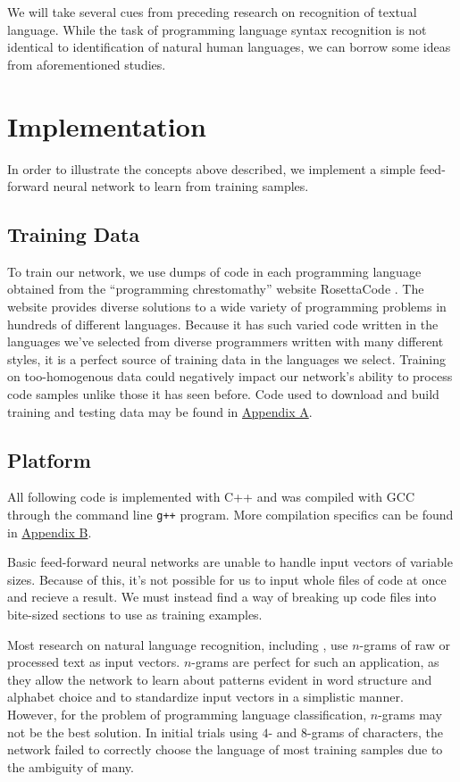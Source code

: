 \documentclass{article}
\begin{document}
We will take several cues from preceding research on recognition of textual language. While the task of programming language syntax recognition is not identical to identification of natural human languages, we can borrow some ideas from aforementioned studies.

\section{Implementation}
In order to illustrate the concepts above described, we implement a simple feed-forward neural network to learn from training samples.

\subsection{Training Data}
To train our network, we use dumps of code in each programming language obtained from the ``programming chrestomathy'' website RosettaCode \cite{rosettacode}. The website provides diverse solutions to a wide variety of programming problems in hundreds of different languages. Because it has such varied code written in the languages we've selected from diverse programmers written with many different styles, it is a perfect source of training data in the languages we select. Training on too-homogenous data could negatively impact our network's ability to process code samples unlike those it has seen before. Code used to download and build training and testing data may be found in  \hyperref[sec:appendix_a]{Appendix A}.
\subsection{Platform}
All following code is implemented with C++ and was compiled with GCC through the command line \texttt{g++} program. More compilation specifics can be found in \hyperref[sec:appendix_b]{Appendix B}.

Basic feed-forward neural networks are unable to handle input vectors of variable sizes. Because of this, it's not possible for us to input whole files of code at once and recieve a result. We must instead find a way of breaking up code files into bite-sized sections to use as training examples.

Most research on natural language recognition, including \cite{langidstanford}, use $n$-grams of raw or processed text as input vectors. $n$-grams are perfect for such an application, as they allow the network to learn about patterns evident in word structure and alphabet choice and to standardize input vectors in a simplistic manner. However, for the problem of programming language classification, $n$-grams may not be the best solution. In initial trials using $4$- and $8$-grams of characters, the network failed to correctly choose the language of most training samples due to the ambiguity of many.
\end{document}
